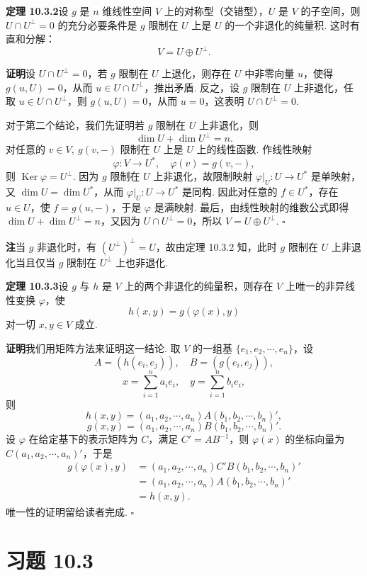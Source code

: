 \documentclass[UTF8, 12pt, fontset=fandol, oneside]{ctexart}
\begin{document}
\noindent\textbf{定理 10.3.2}\quad 设 $g$ 是 $n$ 维线性空间 $V$ 上的对称型（交错型），$U$ 是 $V$ 的子空间，则 $U\cap U^\perp=0$ 的充分必要条件是 $g$ 限制在 $U$ 上是 $U$ 的一个非退化的纯量积. 这时有直和分解：
\[
  V=U\oplus U^\perp.
\]

\noindent\textbf{证明}\quad 设 $U\cap U^\perp=0$，若 $g$ 限制在 $U$ 上退化，则存在 $U$ 中非零向量 $u$，使得 $g(u,U)=0$，从而 $u\in U\cap U^\perp$，推出矛盾. 反之，设 $g$ 限制在 $U$ 上非退化，任取 $u\in U\cap U^\perp$，则 $g(u,U)=0$，从而 $u=0$，这表明 $U\cap U^\perp=0$.

对于第二个结论，我们先证明若 $g$ 限制在 $U$ 上非退化，则
\[
  \dim U+\dim U^\perp=n.
\]
对任意的 $v\in V,\ g(v,-)$ 限制在 $U$ 上是 $U$ 上的线性函数. 作线性映射
\[
  \varphi:V\to U^*,\quad \varphi(v)=g(v,-),
\]
则 $\operatorname{Ker}\varphi=U^\perp$. 因为 $g$ 限制在 $U$ 上非退化，故限制映射 $\varphi|_U:U\to U^*$ 是单映射，又 $\dim U=\dim U^*$，从而 $\varphi|_U:U\to U^*$ 是同构. 因此对任意的 $f\in U^*$，存在 $u\in U$，使 $f=g(u,-)$，于是 $\varphi$ 是满映射. 最后，由线性映射的维数公式即得 $\dim U+\dim U^\perp=n$，又因为 $U\cap U^\perp=0$，所以 $V=U\oplus U^\perp$. $\square$

\noindent\textbf{注}\quad 当 $g$ 非退化时，有 $(U^\perp)^\perp=U$，故由定理 10.3.2 知，此时 $g$ 限制在 $U$ 上非退化当且仅当 $g$ 限制在 $U^\perp$ 上也非退化.

\noindent\textbf{定理 10.3.3}\quad 设 $g$ 与 $h$ 是 $V$ 上的两个非退化的纯量积，则存在 $V$ 上唯一的非异线性变换 $\varphi$，使
\[
  h(x,y)=g(\varphi(x),y)
\]
对一切 $x,y\in V$ 成立.

\noindent\textbf{证明}\quad 我们用矩阵方法来证明这一结论. 取 $V$ 的一组基 $\{e_1,e_2,\cdots,e_n\}$，设
\[
  A=(h(e_i,e_j)),\quad B=(g(e_i,e_j)),
\]
\[
  x=\sum_{i=1}^n a_ie_i,\quad y=\sum_{i=1}^n b_ie_i,
\]
则
\[
  h(x,y)=(a_1,a_2,\cdots,a_n)A(b_1,b_2,\cdots,b_n)',
\]
\[
  g(x,y)=(a_1,a_2,\cdots,a_n)B(b_1,b_2,\cdots,b_n)'.
\]
设 $\varphi$ 在给定基下的表示矩阵为 $C$，满足 $C'=AB^{-1}$，则 $\varphi(x)$ 的坐标向量为 $C(a_1,a_2,\cdots,a_n)'$，于是
\[
\begin{aligned}
  g(\varphi(x),y)&=(a_1,a_2,\cdots,a_n)C'B(b_1,b_2,\cdots,b_n)'\\
  &=(a_1,a_2,\cdots,a_n)A(b_1,b_2,\cdots,b_n)'\\
  &=h(x,y).
\end{aligned}
\]
唯一性的证明留给读者完成. $\square$

\section*{习题 10.3}
\end{document}
